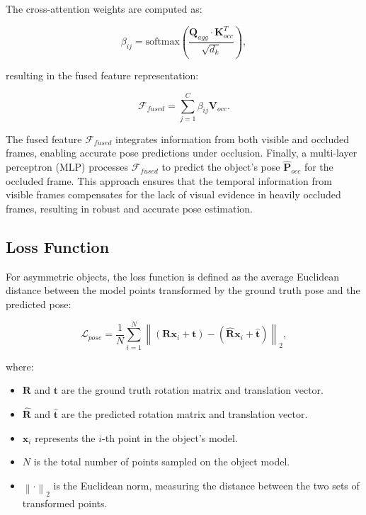 \noindent The cross-attention weights are computed as:

\begin{equation}
\beta_{ij} = \text{softmax}\left(\frac{\mathbf{Q}_{agg} \cdot \mathbf{K}_{occ}^T}{\sqrt{d_k}}\right),
\end{equation}

\noindent resulting in the fused feature representation:

\begin{equation}
\mathcal{F}_{fused} = \sum_{j=1}^{C} \beta_{ij} \mathbf{V}_{occ}.
\end{equation}

\noindent The fused feature $\mathcal{F}_{fused}$ integrates information from both visible and occluded frames, enabling accurate pose predictions under occlusion. Finally, a multi-layer perceptron (MLP) processes $\mathcal{F}_{fused}$ to predict the object's pose $\hat{\mathbf{P}}_{occ}$ for the occluded frame. This approach ensures that the temporal information from visible frames compensates for the lack of visual evidence in heavily occluded frames, resulting in robust and accurate pose estimation.

\subsection{Loss Function}

For asymmetric objects, the loss function is defined as the average Euclidean distance between the model points transformed by the ground truth pose and the predicted pose:

\begin{equation}
\mathcal{L}_{pose} = \frac{1}{N} \sum_{i=1}^{N} \left\| (\mathbf{R} \mathbf{x}_i + \mathbf{t}) - (\hat{\mathbf{R}} \mathbf{x}_i + \hat{\mathbf{t}}) \right\|_2,
\end{equation}

\noindent where:

\begin{itemize}
    \item $\mathbf{R}$ and $\mathbf{t}$ are the ground truth rotation matrix and translation vector.
    \item $\hat{\mathbf{R}}$ and $\hat{\mathbf{t}}$ are the predicted rotation matrix and translation vector.
    \item $\mathbf{x}_i$ represents the $i$-th point in the object's model.
    \item $N$ is the total number of points sampled on the object model.
    \item $\left\| \cdot \right\|_2$ is the Euclidean norm, measuring the distance between the two sets of transformed points.
\end{itemize}


